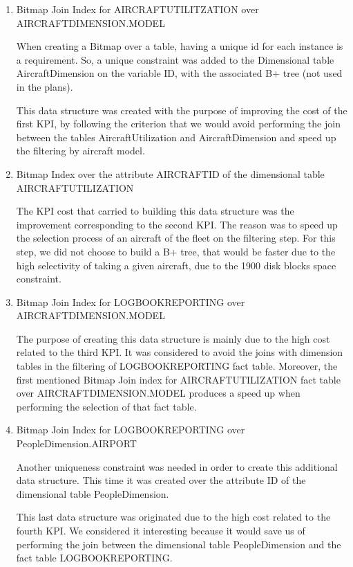 \documentclass{article} %
\begin{document}
\begin{enumerate}
    \item Bitmap Join Index for AIRCRAFTUTILITZATION over AIRCRAFTDIMENSION.MODEL
    
    When creating a Bitmap over a table, having a unique id for each instance is a requirement. So, a unique constraint was added to the Dimensional table AircraftDimension on the variable ID, with the associated B+ tree (not used in the plans).
    
    This data structure was created with the purpose of improving the cost of the first KPI, by following the criterion that we would avoid performing the join between the tables AircraftUtilization and AircraftDimension and speed up the filtering by aircraft model.
    
    \item Bitmap Index over the attribute AIRCRAFTID of the dimensional table AIRCRAFTUTILIZATION
    
    The KPI cost that carried to building this data structure was the improvement corresponding to the second KPI. The reason was to speed up the selection process of an aircraft of the fleet on the filtering step. For this step, we did not choose to build a B+ tree, that would be faster due to the high selectivity of taking a given aircraft, due to the 1900 disk blocks space constraint.
    
    \item Bitmap Join Index for LOGBOOKREPORTING over AIRCRAFTDIMENSION.MODEL
    
    The purpose of creating this data structure is mainly due to the high cost related to the third KPI. It was considered to avoid the joins with dimension tables in the filtering of LOGBOOKREPORTING fact table. Moreover, the first mentioned Bitmap Join index for AIRCRAFTUTILIZATION fact table over AIRCRAFTDIMENSION.MODEL produces a speed up when performing the selection of that fact table.
    
    \item Bitmap Join Index for LOGBOOKREPORTING over PeopleDimension.AIRPORT
    
    Another uniqueness constraint was needed in order to create this additional data structure. This time it was created over the attribute ID of the dimensional table PeopleDimension.
    
    This last data structure was originated due to the high cost related to the fourth KPI. We considered it interesting because it would save us of performing the join between the dimensional table PeopleDimension and the fact table LOGBOOKREPORTING.
    
\end{enumerate}{}
\end{document}
